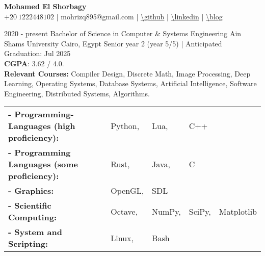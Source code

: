 \documentclass[hidelinks]{report}
\begin{document}
\begin{center}
    \noindent \Huge{ \selectfont \bfseries Mohamed El Shorbagy}\\[.4em]
    \large
    $+20 \ 1222448102$           |
    mohrizq895@gmail.com         | 
    \underline{\url{\github}}    |
    \underline{\url{\linkedin}}  |
    \underline{\url{\blog}}  
\end{center}


\vspace{2mm}

\large
{}

\entry
    {2020 - present} 
    {Bachelor of Science in Computer \& Systems Engineering }
    {Ain Shams University}
    {Cairo, Egypt  }
    {\textbullet Senior year 2 (year 5/5) | Anticipated Graduation: Jul 2025 \\ 
     \textbullet \textbf{CGPA}: 3.62 / 4.0. \\  
     \textbullet \textbf{Relevant Courses:} Compiler Design, Discrete Math, Image Processing, Deep Learning,
     Operating Systems, Database Systems, Artificial Intelligence, Software Engineering, Distributed Systems, 
     Algorithms. 
    }  


\vspace{2mm}



\begin{tabular}{ l l l l l}
      \bf{- Programming-Languages (high proficiency):} & Python, & Lua, & C++ \\ 
      \bf{- Programming Languages (some proficiency):} & Rust, & Java, & C \\ 
      \bf{- Graphics:} & OpenGL,&  SDL \\ 
      \bf{- Scientific Computing:} & Octave, & NumPy, & SciPy, & Matplotlib \\ 
      \bf{- System and Scripting:} & Linux, & Bash \\ 
       
\end{tabular}
\end{document}
